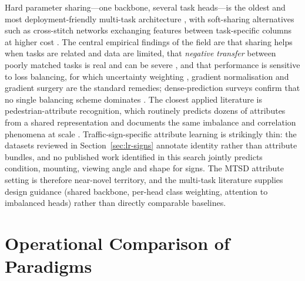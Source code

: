 Hard parameter sharing---one backbone, several task heads---is the oldest and most deployment-friendly multi-task architecture \citep{caruana1997multitask,ruder2017overview}, with soft-sharing alternatives such as cross-stitch networks exchanging features between task-specific columns at higher cost \citep{misra2016cross}. The central empirical findings of the field are that sharing helps when tasks are related and data are limited, that \emph{negative transfer} between poorly matched tasks is real and can be severe \citep{standley2020tasks}, and that performance is sensitive to loss balancing, for which uncertainty weighting \citep{kendall2018multi}, gradient normalisation \citep{chen2018gradnorm} and gradient surgery \citep{yu2020gradient} are the standard remedies; dense-prediction surveys confirm that no single balancing scheme dominates \citep{vandenhende2021multi}. The closest applied literature is pedestrian-attribute recognition, which routinely predicts dozens of attributes from a shared representation and documents the same imbalance and correlation phenomena at scale \citep{wang2022pedestrian}. Traffic-sign-specific attribute learning is strikingly thin: the datasets reviewed in Section~\ref{sec:lr-signs} annotate identity rather than attribute bundles, and no published work identified in this search jointly predicts condition, mounting, viewing angle and shape for signs. The MTSD attribute setting is therefore near-novel territory, and the multi-task literature supplies design guidance (shared backbone, per-head class weighting, attention to imbalanced heads) rather than directly comparable baselines.

\section{Operational Comparison of Paradigms}
\label{sec:lr-operational}

